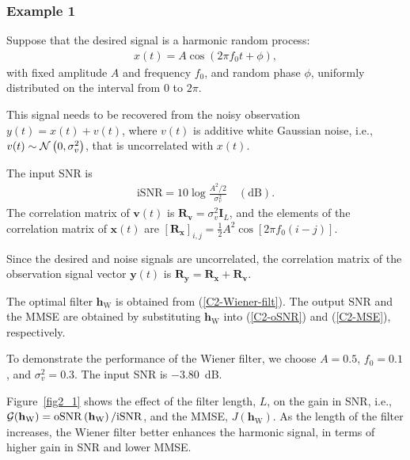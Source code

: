 \documentclass[10pt,pdflatex,headrule,landscape]{beamer}
\begin{document}
\begin{frame}[allowframebreaks]
\end{frame}


\begin{frame}
    \frametitle{Example 1}

Suppose that the desired signal is a harmonic random process:
\begin{eqnarray*}
x(t)=A\cos\left(2\pi f_0 t+\phi\right) ,
\end{eqnarray*}
with fixed amplitude $A$ and frequency $f_0$, and random phase $\phi$, uniformly distributed on the interval from $0$ to $2\pi$.

This signal needs to be recovered from the noisy observation $y(t)=x(t)+v(t)$, where $v(t)$ is additive white Gaussian noise, i.e., $v(t)\sim {\cal N}\left(0,\sigma_v^2\right)$, that is uncorrelated with $x(t)$.

The input SNR is
\begin{eqnarray*}
\mathrm{iSNR}=10\log\frac{A^2/2}{\sigma_v^2} \quad \mathrm{(dB)} .
\end{eqnarray*}
The correlation matrix of $\mathbf{v}(t)$ is $\mathbf{R}_{\mathbf{v}}=\sigma_v^2\mathbf{I}_L$, and the elements of the correlation matrix of $\mathbf{x}(t)$ are $\left[\mathbf{R}_{\mathbf{x}}\right]_{i,j}=\frac{1}{2} A^2\cos\left[2\pi f_0(i-j)\right]$.

\end{frame}
\begin{frame}[allowframebreaks]

Since the desired and noise signals are uncorrelated, the correlation matrix of the observation signal vector $\mathbf{y}(t)$ is $\mathbf{R}_{\mathbf{y}}=\mathbf{R}_{\mathbf{x}}+\mathbf{R}_{\mathbf{v}}$.

The optimal filter $\mathbf{h}_{\mathrm{W}}$ is obtained from (\ref{C2-Wiener-filt}). The output SNR and the MMSE are obtained by substituting $\mathbf{h}_{\mathrm{W}}$ into (\ref{C2-oSNR}) and (\ref{C2-MSE}), respectively.

To demonstrate the performance of the Wiener filter, we choose $A=0.5$, $f_0=0.1$, and $\sigma_v^2=0.3$. The input SNR is $-3.80$~dB.

\end{frame}
\begin{frame}[allowframebreaks]

Figure~\ref{fig2_1} shows the effect of the filter length, $L$, on the gain in SNR, i.e., ${\cal G}(\mathbf{h}_{\mathrm{W}}) = \mathrm{oSNR}\left( \mathbf{h}_{\mathrm{W}} \right) / \mathrm{iSNR}$, and the MMSE, $J(\mathbf{h}_{\mathrm{W}})$.
As the length of the filter increases, the Wiener filter better enhances the harmonic signal, in terms of higher gain in SNR and lower MMSE.


\end{frame}
\end{document}
